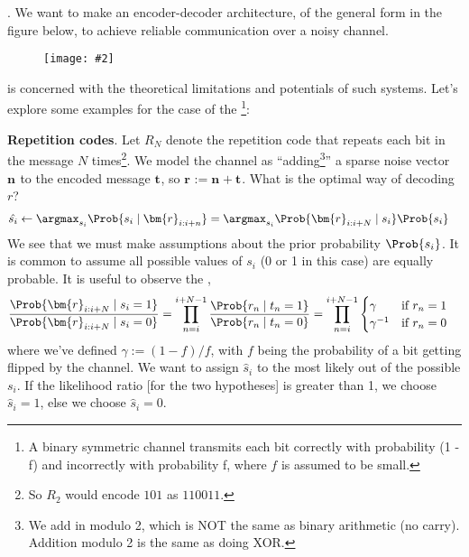 \documentclass[11pt]{article}
\renewcommand\vec[2][]{\bm{#2}_{#1}}
\newcommand\myfig[2][0.3\textwidth]{\begin{figure}[h!]\centering\texttt{[image: \#2]}\end{figure}}
\newcommand\myspace[1][]{\vspace{#1\bigskipamount}}
\newcommand\p{\Needspace{10\baselineskip} \noindent}
\begin{document}
\myspace
\p {}. We want to make an encoder-decoder architecture, of the general form in the figure below, to achieve reliable communication over a noisy channel.
\myfig[0.55\textwidth]{ITILA_1_6.png} 

 is concerned with the theoretical limitations and potentials of such systems. Let's explore some examples for the case of the \footnote{A binary symmetric channel transmits each bit correctly with probability (1 - f) and incorrectly with probability f, where $f$ is assumed to be small.}:
\begin{compactitem}
	\item \textbf{Repetition codes}. Let $R_N$ denote the repetition code that repeats each bit in the message $N$ times\footnote{So $R_2$ would encode $101$ as $110011$.}. We model the channel as ``adding\footnote{We add in modulo 2, which is NOT the same as binary arithmetic (no carry). Addition modulo 2 is the same as doing XOR.}'' a sparse noise vector $\vec{n}$ to the encoded message $\vec{t}$, so $\vec{r} := \vec{n} + \vec{t}$. What is the optimal way of decoding $r$?
	\begin{align}
	\hat{s_i} &\leftarrow \argmax_{s_i} \Prob{ s_i \mid \vec[i:i+n]{r} } = \argmax_{s_i} \Prob{ \vec[i:i+N]{r} \mid s_i } \Prob{ s_i } 
	\end{align}
	We see that we must make assumptions about the prior probability $\Prob{s_i}$. It is common to assume all possible values of $s_i$ (0 or 1 in this case) are equally probable. It is useful to observe the ,
	\begin{align}
	\frac{  \Prob{ \vec[i:i+N]{r} \mid s_i = 1 }  }{   \Prob{ \vec[i:i+N]{r} \mid s_i = 0 } }
	&= \prod_{n = i}^{i + N - 1} \frac{  \Prob{ r_n \mid t_n = 1 }  }{   \Prob{ r_n \mid t_n = 0 } } 
	=  \prod_{n = i}^{i + N - 1} \begin{cases}
	\gamma & \text{if } r_n = 1 \\
	\gamma^{-1} & \text{if } r_n = 0
	\end{cases}
	\end{align}
	where we've defined $\gamma := (1 - f) / f$, with $f$ being the probability of a bit getting flipped by the channel. We want to assign $\hat s_i$ to the most likely  out of the possible $s_i$. If the likelihood ratio [for the two hypotheses] is greater than 1, we choose $\hat s_i = 1$, else we choose $ \hat s_i = 0$.  
	

\end{compactitem}
\end{document}
